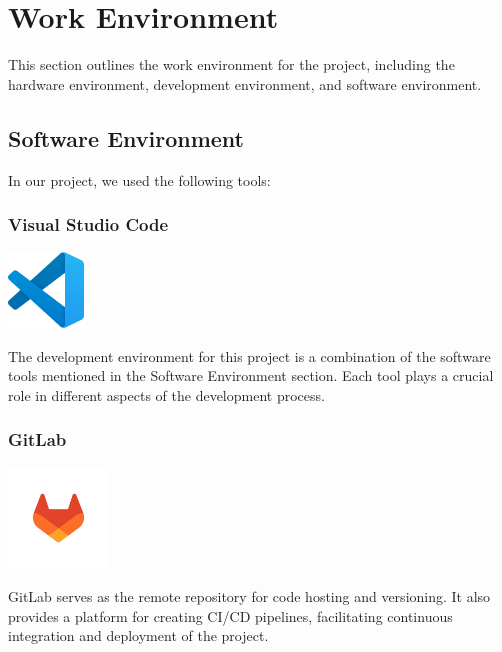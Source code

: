 \section{Work Environment}

This section outlines the work environment for the project, including the hardware environment, development environment, and software environment.

\subsection{Software Environment}

In our project, we used the following tools:

\subsubsection{Visual Studio Code}
\begin{center}
\includegraphics[width=0.15\textwidth]{Images/logos/vscode.png}
\label{fig:vscode}
\end{center}
The development environment for this project is a combination of the software tools mentioned in the Software Environment section. Each tool plays a crucial role in different aspects of the development process.

\subsubsection{GitLab}
\begin{center}
\includegraphics[width=0.2\textwidth]{Images/logos/gitlab-logo-500.png}
\label{fig:gitlab}
\end{center}
GitLab serves as the remote repository for code hosting and versioning. It also provides a platform for creating CI/CD pipelines, facilitating continuous integration and deployment of the project.

